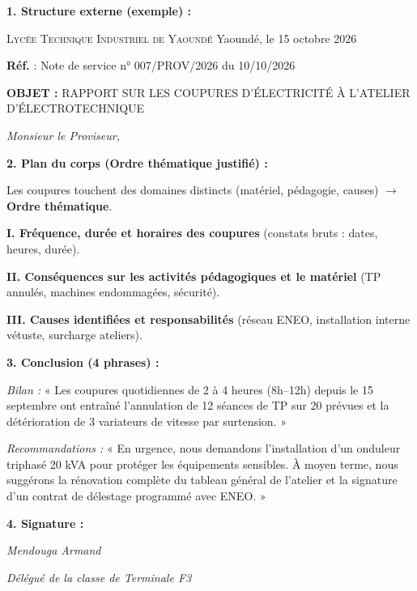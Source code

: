 \documentclass[11pt]{article}
\begin{document}
\begin{corrige}
\textbf{1. Structure externe (exemple) :}\par
\textsc{Lycée Technique Industriel de Yaoundé} \hfill Yaoundé, le 15 octobre 2026\par
\textbf{Réf.} : Note de service n° 007/PROV/2026 du 10/10/2026\par
\textbf{OBJET :} RAPPORT SUR LES COUPURES D'ÉLECTRICITÉ À L'ATELIER D'ÉLECTROTECHNIQUE\par
\emph{Monsieur le Proviseur,}\par
\vspace{2mm}
\textbf{2. Plan du corps (Ordre thématique justifié) :}\par
Les coupures touchent des domaines distincts (matériel, pédagogie, causes) $\rightarrow$ \textbf{Ordre thématique}.\par
\textbf{I. Fréquence, durée et horaires des coupures} (constats bruts : dates, heures, durée).\par
\textbf{II. Conséquences sur les activités pédagogiques et le matériel} (TP annulés, machines endommagées, sécurité).\par
\textbf{III. Causes identifiées et responsabilités} (réseau ENEO, installation interne vétuste, surcharge ateliers).\par
\vspace{2mm}
\textbf{3. Conclusion (4 phrases) :}\par
\textit{Bilan :} « Les coupures quotidiennes de 2 à 4 heures (8h--12h) depuis le 15 septembre ont entraîné l'annulation de 12 séances de TP sur 20 prévues et la détérioration de 3 variateurs de vitesse par surtension. »\par
\textit{Recommandations :} « En urgence, nous demandons l'installation d'un onduleur triphasé 20 kVA pour protéger les équipements sensibles. À moyen terme, nous suggérons la rénovation complète du tableau général de l'atelier et la signature d'un contrat de délestage programmé avec ENEO. »\par
\vspace{2mm}
\textbf{4. Signature :}\par
\emph{Mendouga Armand}\par
\emph{Délégué de la classe de Terminale F3}
\end{corrige}
\end{document}
